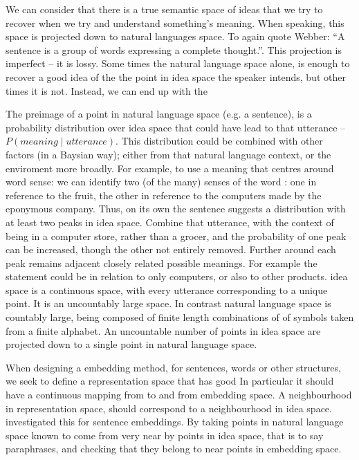 \documentclass{book}
\begin{document}
We can consider that there is a true semantic space of ideas that we try to recover when we try and understand something's meaning.
When speaking, this space is projected down to natural languages space.
To again quote Webber: ``A sentence is a group of words expressing a complete thought.''.
This projection is imperfect -- it is lossy.
Some times the natural language space alone, is enough to recover a good idea of the the point in idea space the speaker intends,
but other times it is not.
Instead, we can end up with the 


The preimage of a point in natural language space (e.g. a sentence),
is a probability distribution over idea space that could have lead to that utterance -- $P(meaning \mid utterance)$.
This distribution could be combined with other factors (in a Baysian way); either from that natural language context, or the enviroment more broadly.
For example, to use a meaning that centres around word sense:
we can identify two (of the many) senses of the word :
one in reference to the fruit, the other in reference to the computers made by the eponymous company.
Thus, on its own the sentence 
suggests a distribution with at least two peaks in idea space.
Combine that utterance, with the context of being in a computer store, rather than a grocer, and the probability of one peak can be increased, though  the other not entirely removed.
Further around each peak remains adjacent closely related possible meanings.
For example the statement could be in relation to only computers, or also to other products.
idea space is a continuous space, with every utterance corresponding to a unique point. It is an uncountably large space.
In contrast natural language space is countably large, being composed of finite length combinations of of symbols taken from a finite alphabet.
An uncountable number of points in idea space are projected down to a single point in natural language space.




When designing a embedding method, for sentences, words or other structures,
we seek to define a representation space
that has good 
In particular it should have a continuous mapping from to and from embedding space.
A neighbourhood in representation space, should correspond to a neighbourhood in idea space.
 investigated this for sentence embeddings.
By taking points in natural language space known to come from very near by points in idea space, that is to say paraphrases,
and checking that they belong to near points in embedding space.
\end{document}

